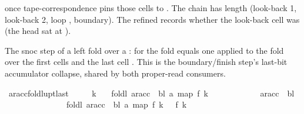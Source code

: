 \begin{isabellebody}
\begin{isamarkuptext}
   once tape-correspondence pins those
  cells to .  The chain has length 
  (look-back 1, look-back 2, loop , boundary).  The
  refined  records whether the look-back cell was
   (the head sat at ).%
\end{isamarkuptext}\isamarkuptrue%
%
\begin{isamarkuptext}%
The snoc step of a left fold over a :
  for  the fold equals one  applied to the
  fold over the first  cells and the last cell
  .  This is the boundary/finish step's last-bit
  accumulator collapse, shared by both proper-read consumers.%
\end{isamarkuptext}\isamarkuptrue%
\isamarkupfalse%
\ ar{\isacharunderscore}{\kern0pt}acc{\isacharunderscore}{\kern0pt}foldl{\isacharunderscore}{\kern0pt}upt{\isacharunderscore}{\kern0pt}last{\isacharcolon}{\kern0pt}\isanewline
\ \ \ {\isachardoublequoteopen}{}\ {\isacharless}{\kern0pt}\ k{\isachardoublequoteclose}\isanewline
\ \ \ {\isachardoublequoteopen}foldl\ {\isacharparenleft}{\kern0pt}ar{\isacharunderscore}{\kern0pt}acc\ {\isasymGamma}\ bl{\isacharparenright}{\kern0pt}\ a\ {\isacharparenleft}{\kern0pt}map\ f\ {\isacharbrackleft}{\kern0pt}{}{\isachardot}{\kern0pt}{\isachardot}{\kern0pt}{\isacharless}{\kern0pt}k{\isacharbrackright}{\kern0pt}{\isacharparenright}{\kern0pt}\isanewline
\ \ \ \ \ \ \ \ \ \ \ {\isacharequal}{\kern0pt}\ ar{\isacharunderscore}{\kern0pt}acc\ {\isasymGamma}\ bl\isanewline
\ \ \ \ \ \ \ \ \ \ \ \ \ \ \ {\isacharparenleft}{\kern0pt}foldl\ {\isacharparenleft}{\kern0pt}ar{\isacharunderscore}{\kern0pt}acc\ {\isasymGamma}\ bl{\isacharparenright}{\kern0pt}\ a\ {\isacharparenleft}{\kern0pt}map\ f\ {\isacharbrackleft}{\kern0pt}{}{\isachardot}{\kern0pt}{\isachardot}{\kern0pt}{\isacharless}{\kern0pt}k\ {\isacharminus}{\kern0pt}\ {}{\isacharbrackright}{\kern0pt}{\isacharparenright}{\kern0pt}{\isacharparenright}{\kern0pt}\ {\isacharparenleft}{\kern0pt}f\ {\isacharparenleft}{\kern0pt}k\ {\isacharminus}{\kern0pt}\ {}{\isacharparenright}{\kern0pt}{\isacharparenright}{\kern0pt}{\isachardoublequoteclose}\isanewline

\end{isabellebody}
